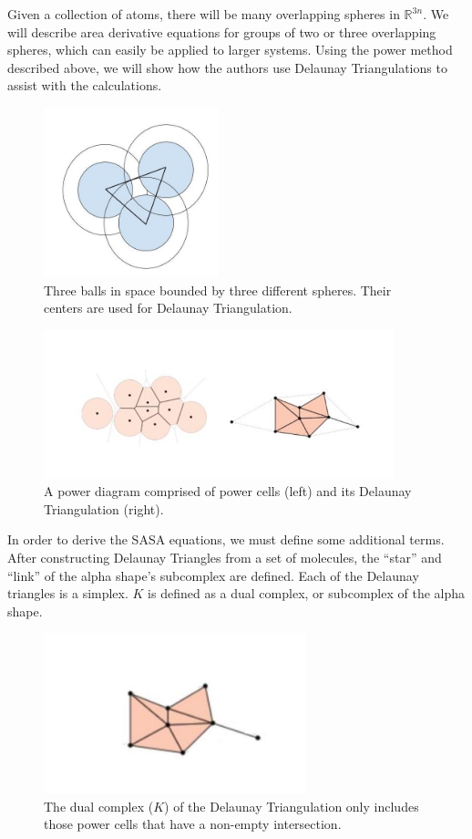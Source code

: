 \documentclass{article}
\newcommand{\R}{\mathbb{R}}
\begin{document}
Given a collection of atoms, there will be many overlapping spheres in $\R^{3n}$. We will describe area derivative equations for groups of two or three overlapping spheres, which can easily be applied to larger systems. Using the power method described above, we will show how the authors use Delaunay Triangulations to assist with the calculations.

\begin{figure}[h!]
\caption{Three balls in space bounded by three different spheres. Their centers are used for Delaunay Triangulation.}
\centerline{\includegraphics[width=2in]{Figure2}}
\end{figure}


\begin{figure}[h!]
\caption{A power diagram comprised of power cells (left) and its Delaunay Triangulation (right).\cite{Bryant}}
\centerline{\includegraphics[width=4in]{Figure4}}
\end{figure}


In order to derive the SASA equations, we must define some additional terms. After constructing Delaunay Triangles from a set of molecules, the “star” and “link” of the alpha shape's subcomplex are defined. Each of the Delaunay triangles is a simplex. $K$ is defined as a dual complex, or subcomplex of the alpha shape.

\begin{figure}[h!]
\caption{The dual complex ($K$) of the Delaunay Triangulation only includes those power cells that have a non-empty intersection.\cite{Bryant}}
\centerline{\includegraphics[width=3in]{Figure9}}
\end{figure}
\end{document}
